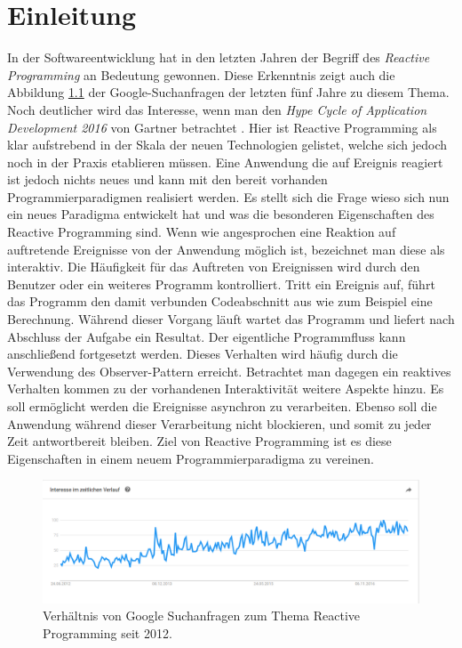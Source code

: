 \chapter{Einleitung}
\label{cha:einleitung}
In der Softwareentwicklung hat in den letzten Jahren der Begriff des \textit{Reactive Programming} an Bedeutung gewonnen. Diese Erkenntnis zeigt auch die Abbildung \ref{pic:googletrend} der Google-Suchanfragen der letzten fünf Jahre zu diesem Thema. Noch deutlicher wird das Interesse, wenn man den \textit{Hype Cycle of Application Development 2016} von Gartner betrachtet \cite{cycle}. Hier ist Reactive Programming als klar aufstrebend in der Skala der neuen Technologien gelistet, welche sich jedoch noch in der Praxis etablieren müssen. Eine Anwendung die auf Ereignis reagiert ist jedoch nichts neues und kann mit den bereit vorhanden Programmierparadigmen realisiert werden. Es stellt sich die Frage wieso sich nun ein neues Paradigma entwickelt hat und was die besonderen Eigenschaften des Reactive Programming sind. Wenn wie angesprochen eine Reaktion auf auftretende Ereignisse von der Anwendung möglich ist, bezeichnet man diese als interaktiv. Die Häufigkeit für das Auftreten von Ereignissen wird durch den Benutzer oder ein weiteres Programm kontrolliert. Tritt ein Ereignis auf, führt das Programm den damit verbunden Codeabschnitt aus wie zum Beispiel eine Berechnung. Während dieser Vorgang läuft wartet das Programm und liefert nach Abschluss der Aufgabe ein Resultat. Der eigentliche Programmfluss kann anschließend fortgesetzt werden. Dieses Verhalten wird häufig durch die Verwendung des Observer-Pattern erreicht. Betrachtet man dagegen ein reaktives Verhalten kommen zu der vorhandenen Interaktivität weitere Aspekte hinzu. Es soll ermöglicht werden die Ereignisse asynchron zu verarbeiten. Ebenso soll die Anwendung während dieser Verarbeitung nicht blockieren, und somit zu jeder Zeit antwortbereit bleiben. Ziel von Reactive Programming ist es diese Eigenschaften in einem neuem Programmierparadigma zu vereinen.
\begin{figure}[hbt]
	\centering
	\includegraphics[width=1\textwidth]{Abb/rptrend}
	\caption{Verhältnis von Google Suchanfragen zum Thema Reactive Programming seit 2012.}
	\label{pic:googletrend}
\end{figure}
